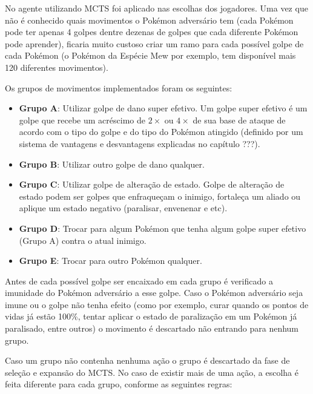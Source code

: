 
No agente utilizando MCTS foi aplicado nas escolhas dos jogadores. Uma vez que não é conhecido quais movimentos o Pokémon adversário tem (cada Pokémon pode ter apenas 4 golpes dentre dezenas de golpes que cada diferente Pokémon pode aprender), ficaria muito custoso criar um ramo para cada possível golpe de cada Pokémon (o Pokémon da Espécie Mew por exemplo, tem disponível mais 120 diferentes movimentos).

Os grupos de movimentos implementados foram os seguintes:

\begin{itemize}
	
	\item \textbf{Grupo A}: Utilizar golpe de dano super efetivo. Um golpe super efetivo é um golpe que recebe um acréscimo de $ 2 \times$ ou $ 4 \times$ de sua base de ataque de acordo com o tipo do golpe e do tipo do Pokémon atingido (definido por um sistema de vantagens e desvantagens explicadas no capítulo ???).
	
	\item \textbf{Grupo B}: Utilizar outro golpe de dano qualquer.
	
	\item \textbf{Grupo C}: Utilizar golpe de alteração de estado. Golpe de alteração de estado podem ser golpes que enfraqueçam o inimigo, fortaleça um aliado ou aplique um estado negativo (paralisar, envenenar e etc).
	
	\item \textbf{Grupo D}: Trocar para algum Pokémon que tenha algum golpe super efetivo (Grupo A) contra o atual inimigo.
	
	\item \textbf{Grupo E}: Trocar para outro Pokémon qualquer.
	
\end{itemize}

Antes de cada possível golpe ser encaixado em cada grupo é verificado a imunidade do Pokémon adversário a esse golpe. Caso o Pokémon adversário seja imune ou o golpe não tenha efeito (como por exemplo, curar quando os pontos de vidas já estão 100\%, tentar aplicar o estado de paralização em um Pokémon já paralisado, entre outros) o movimento é descartado não entrando para nenhum grupo.

Caso um grupo não contenha nenhuma ação o grupo é descartado da fase de seleção e expansão do MCTS. No caso de existir mais de uma ação, a escolha é feita diferente para cada grupo, conforme as seguintes regras:

